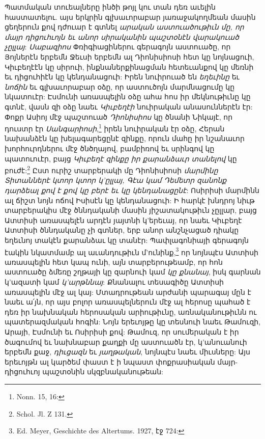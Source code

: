 \documentclass{article}
\begin{document}
{Պատմական տուեալները ինծի թոյլ կու տան դեռ աւելին հաստատելու. այս երկրին գլխաւորաբար յառաջակողմեան մասին ցեղերուն քով դժուար է գտնել \emph{արական աստուածութիւն մը, որ մայր դիցուհւոյն եւ անոր սիրականին պաշտօնէն վարակուած չըլլայ}: \emph{Սաբազիոս} Փռիգիացիներու գերագոյն աստուածը, որ Յոյներէն երբեմն Ջեւսի երբեմն ալ Դիոնիսիոսի հետ կը նոյնացուի, Կիւբեղէէն կը սիրուի, ինքնաներքինացման հետեւանքով կը մեռնի եւ դիցուհիէն կը կենդանացուի: Իրեն նուիրուած են \emph{եղեւինը} եւ \emph{նոճին} եւ գլխաւորաբար օձը, որ աստուծոյն մարմնացումը կը նկատուէր: Էսմունի առասպելին օձը ահա հոս իր մեկնութիւնը կը գտնէ, վասն զի օձը նաեւ \emph{Կիւբեղէի} նուիրական անասուններէն էր: Փոքր Ասիոյ մէջ պաշտուած \emph{Դիոնիսիոս} կը ծնանի Նիկայէ, որ դուստր էր \emph{Սանգարիոսի},\footnote{Nonn. 15, 16:} իրեն նուիրական էր օձը, Հերան նախանձէն կը խելագարեցընէ զինքը, որուն մահը իր նշանաւոր խորհուրդներու մէջ ծնծղայով, բամբիռով եւ սրինգով կը պատուուէր, բայց \emph{Կիւբեղէ զինքը իր քարանձաւր տանելով} կը բուժէ:\footnote{Schol. Jl. Z 131.} Ըստ ուրիշ տարբերակի մը Դիոնիսիոսի \emph{մարմինը Տիտաններէ կտոր կտոր կ'ըլլայ, Գէա կամ Դեմետր զանոնք դարձեալ քով է քով կը բերէ եւ կը կենդանացընէ}: Ոսիրիսի մարմինն ալ ճիշտ նոյն ոճով Իսիսէն կը կենդանացուի: Ի հարկէ խնդրոյ նիւթ տարբերակիս մէջ ծննդականի մասին յիշատակութիւն չըլլար, բայց Ատտիսի առասպելէն արդէն յայտնի կ'երեւայ, որ նաեւ Կիւբեղէ Ատտիսի ծննդականը չի գտներ, երբ անոր անշնչացած դիակը եղեւնոյ տակէն քարանձաւ կը տանէր: Պափլագոնիայի գերագոյն էակին նկատմամբ ալ աւանդութիւն մ'ունինք,\footnote{Ed. Meyer, Geschichte des Altertums. 1927, էջ 724:} որ նոյնպէս Ատտիսի առասպելին հետ կապ ունի, այն տարբերութեամբ, որ հոն աստուածը ձմեռը շղթայի կը զարնուի կամ \emph{կը քնանայ}, իսկ գարնան կ'ազատի կամ \emph{կ'արթննայ}: Քնանալու տեսագիծը Ատտիսի առասպելին մէջ ալ կայ: Մտադրութեան արժանի պարագայ մըն է նաեւ ա՛յն, որ այս բոլոր առասպելներուն մէջ ալ հերոսը պահած է դեռ իր նախնական հերոսական արիութիւնը, առնականութիւնն ու պատերազմական հոգին: Նոյն երեւոյթը կը տեսնուի նաեւ Թամուզի, Արայի, Էսմունի եւ Ոսիրիսի քով: Թամուզ, որ սումերական է իր ծագումով եւ նախնաբար քաղքի մը աստուածն էր, կ'անուանուի երբեմն քաջ, \emph{դիւցազն} եւ \emph{յաղթական}, նոյնպէս նաեւ միւսները: Այս երեւոյթն ալ կարծեմ փաստ է ի նպաստ փոքրասիական մայր-դիցուհւոյ պաշտօնին սկզբնականութեան:

}
\end{document}
